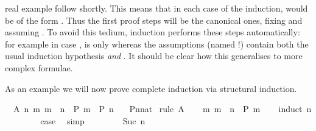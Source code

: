 \begin{isabellebody}
\begin{isamarkuptext}
real example follow shortly.  This means that in each case of the induction,
 would be of the form .  Thus the
first proof steps will be the canonical ones, fixing  and assuming
. To avoid this tedium, induction performs these steps
automatically: for example in case ,  is only
 whereas the assumptions (named !) contain both the
usual induction hypothesis \emph{and} .
It should be clear how this generalises to more complex formulae.

As an example we will now prove complete induction via
structural induction.%
\end{isamarkuptext}%
\isamarkuptrue%
\ \ A{\isacharcolon}\ {\isachardoublequote}{\isacharparenleft}{\isasymAnd}n{\isachardot}\ {\isacharparenleft}{\isasymAnd}m{\isachardot}\ m\ {\isacharless}\ n\ {\isasymLongrightarrow}\ P\ m{\isacharparenright}\ {\isasymLongrightarrow}\ P\ n{\isacharparenright}{\isachardoublequote}\isanewline
\ \ \ {\isachardoublequote}P{\isacharparenleft}n{\isacharcolon}{\isacharcolon}nat{\isacharparenright}{\isachardoublequote}\isanewline
\isamarkupfalse%
\ {\isacharparenleft}rule\ A{\isacharparenright}\isanewline
\ \ \isamarkupfalse%
\ {\isachardoublequote}{\isasymAnd}m{\isachardot}\ m\ {\isacharless}\ n\ {\isasymLongrightarrow}\ P\ m{\isachardoublequote}\isanewline
\ \ \isamarkupfalse%
\ {\isacharparenleft}induct\ n{\isacharparenright}\isanewline
\ \ \ \ \isamarkupfalse%
\ {}\ \isamarkupfalse%
\ {\isacharquery}case\ \isamarkupfalse%
\ simp\isanewline
\ \ \isamarkupfalse%
\isanewline
\ \ \ \ \isamarkupfalse%
\ {\isacharparenleft}Suc\ n{\isacharparenright}\ \ \ %
\isanewline
\ \ \ \ \isamarkupfalse%

\end{isabellebody}
